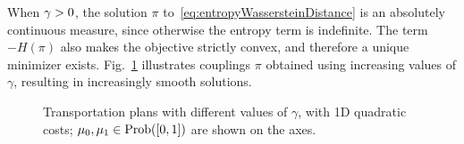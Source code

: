 When $\gamma>0$, the solution $\pi$ to~\eqref{eq:entropyWassersteinDistance} is an absolutely continuous measure, since otherwise the entropy term is indefinite.  The term $-H(\pi)$ also makes the objective strictly convex, and therefore a unique minimizer exists. %
Fig.~\ref{fig:plans} illustrates couplings $\pi$ obtained using increasing values of $\gamma$, resulting in increasingly smooth solutions.

\begin{figure}[t]
\centering
\graphicspath{ {figures/transportation/} }
\def\svgwidth{.45\textwidth}
\vspace{-2mm}
\caption{Transportation plans with different values of $\gamma$, with 1D quadratic costs; $\mu_0,\mu_1\in\mathrm{Prob}([0,1])$ are shown on the axes.}
\vspace{-2mm}
\label{fig:plans}
\end{figure}

